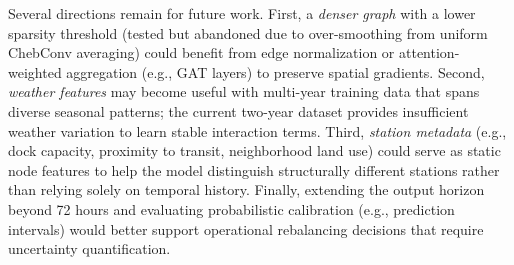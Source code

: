 \documentclass[12pt]{article}
\begin{document}
Several directions remain for future work.
First, a \textit{denser graph} with a lower sparsity threshold (tested but abandoned
due to over-smoothing from uniform ChebConv averaging) could benefit from edge
normalization or attention-weighted aggregation (e.g., GAT layers) to preserve
spatial gradients.
Second, \textit{weather features} may become useful with multi-year training data that
spans diverse seasonal patterns; the current two-year dataset provides insufficient
weather variation to learn stable interaction terms.
Third, \textit{station metadata} (e.g., dock capacity, proximity to transit, neighborhood
land use) could serve as static node features to help the model distinguish
structurally different stations rather than relying solely on temporal history.
Finally, extending the output horizon beyond 72 hours and evaluating probabilistic
calibration (e.g., prediction intervals) would better support operational rebalancing
decisions that require uncertainty quantification.
\end{document}
